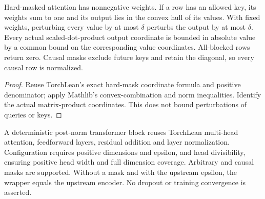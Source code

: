 \begin{lemma}\label{lem:reuse_attention}
\leanok
Hard-masked attention has nonnegative weights. If a row has an allowed key,
its weights sum to one and its output lies in the convex hull of its values.
With fixed weights, perturbing every value by at most $\delta$ perturbs the
output by at most $\delta$. Every actual scaled-dot-product output coordinate
is bounded in absolute value by a common bound on the corresponding value
coordinates. All-blocked rows return zero. Causal masks exclude future keys
and retain the diagonal, so every causal row is normalized.
\end{lemma}
\begin{proof}
\leanok
Reuse TorchLean's exact hard-mask coordinate formula and positive denominator;
apply Mathlib's convex-combination and norm inequalities. Identify the actual
matrix-product coordinates. This does not bound perturbations of queries or keys.
\end{proof}

\begin{definition}\label{def:reuse_transformer}
\leanok
A deterministic post-norm transformer block reuses TorchLean multi-head
attention, feedforward layers, residual addition and layer normalization.
Configuration requires positive dimensions and epsilon, and head divisibility,
ensuring positive head width and full dimension coverage. Arbitrary and causal
masks are supported. Without a mask and with the upstream epsilon, the wrapper
equals the upstream encoder. No dropout or training convergence is asserted.
\end{definition}


